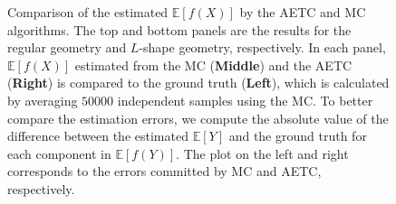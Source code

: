 \documentclass[a4paper,11pt]{article}
\numberwithin{equation}{section}
\theoremstyle{plain}
\theoremstyle{definition}
\def\E{{\mathbb E}}
\begin{document}
\begin{figure}[h!]
\begin{center}
  \caption{\small Comparison of the estimated $\E[f(X)]$ by the AETC and MC algorithms. The top and bottom panels are the results for the regular geometry and $L$-shape geometry, respectively. 
In each panel, $\E[f(X)]$ estimated from the MC (\textbf{Middle}) and the AETC (\textbf{Right}) is compared to the ground truth (\textbf{Left}), which is calculated by averaging $50000$ independent samples using the MC. To better compare the estimation errors, we compute the absolute value of the difference between the estimated $\E[Y]$ and the ground truth for each component in $\E[f(Y)]$. The plot on the left and right corresponds to the errors committed by MC and AETC, respectively.}
  \label{fig:2}
  \end{center}
\end{figure}





\printbibliography
\end{document}
